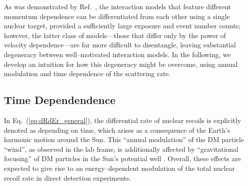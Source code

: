 \documentclass[11pt]{article}
\newcommand{\Eq}[1]{Eq.~(\ref{#1})} \newcommand{\Eqs}[2]{Eqs.~(\ref{#1}) and (\ref{#2})} \newcommand{\Eqm}[2]{Eqs.~(\ref{#1}) through (\ref{#2})}
\begin{document}
As was demonstrated by Ref.~\cite{Gluscevic:2015sqa}, the interaction models that feature different momentum dependence can be differentiated from each other using a single nuclear target, provided a sufficiently large exposure and event number counts; however, the latter class of models---those that differ only by the power of velocity dependence---are far more difficult to disentangle, leaving substantial degeneracy between well--motivated interaction models. In the following, we develop an intuition for how this degeneracy might be overcome, using annual modulation and time dependence of the scattering rate.

\subsection{Time Dependendence}
\label{subsec:time}

In \Eq{eq:dRdEr_general}, the differential rate of nuclear recoils is explicitly denoted as depending on time, which arises as a consequence of the Earth's harmonic motion around the Sun. This ``annual modulation'' of the DM particle ``wind'', as observed in the lab frame, is additionally affected by ``gravitational focusing'' of DM particles in the Sun's potential well \cite{Danby01021957,Griest:1987vc,Sikivie:2002bj,Alenazi:2006wu}. Overall, these effects are expected to give rise to an energy--dependent modulation of the total nuclear recoil rate in direct detection experiments. 
\end{document}
